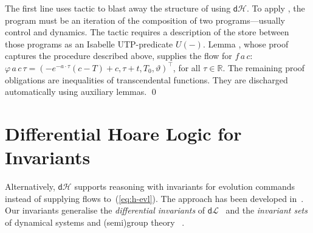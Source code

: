 \documentclass[envcountsame,envcountsect]{llncs}
\newcommand{\dL}{\mathsf{d}\mathcal{L}}
\newcommand{\dH}{\mathsf{d}\mathcal{H}}
\newcommand{\flow}{\varphi}
\newcommand{\reals}{\mathbb{R}}
\begin{document}
\begin{example}
\noindent The first line uses tactic  to blast away the
structure of  using $\dH$. To apply , the
program must be an iteration of the composition of two
programs---usually control and dynamics. The tactic requires a
description of the store between those programs as an Isabelle
UTP-predicate $U(-)$. Lemma
, whose proof captures the procedure described
above, supplies the flow for $f\, a\, c$: $\flow\, a\, c\, \tau =
(-e^{-a\cdot\tau}(c-T)+c, \tau+t, T_0, \vartheta)^\top$, 
for all $\tau\in\reals$. The remaining proof obligations are
inequalities of transcendental functions. They are discharged
automatically using auxiliary lemmas. \qed
\end{example}



\section{Differential Hoare Logic for Invariants}\label{sec:hoare-inv}

Alternatively, $\dH$ supports reasoning with invariants for evolution
commands instead of supplying flows to~(\ref{eq:h-evl}).  The approach
has been developed in~\cite{MuniveS19}. Our invariants generalise the
\emph{differential invariants} of $\dL$~\cite{Platzer18} and the
\emph{invariant sets} of dynamical systems and (semi)group
theory~\cite{Teschl12} .
\end{document}
